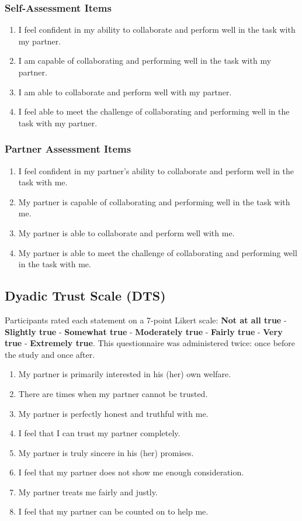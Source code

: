 \subsubsection{Self-Assessment Items}
\begin{enumerate}
    \item I feel confident in my ability to collaborate and perform well in the task with my partner.
    \item I am capable of collaborating and performing well in the task with my partner.
    \item I am able to collaborate and perform well with my partner.
    \item I feel able to meet the challenge of collaborating and performing well in the task with my partner.
\end{enumerate}

\subsubsection{Partner Assessment Items}
\begin{enumerate}
    \item I feel confident in my partner's ability to collaborate and perform well in the task with me.
    \item My partner is capable of collaborating and performing well in the task with me.
    \item My partner is able to collaborate and perform well with me.
    \item My partner is able to meet the challenge of collaborating and performing well in the task with me.
\end{enumerate}

\subsection{Dyadic Trust Scale (DTS)}
\label{appendix:dts}

Participants rated each statement on a 7-point Likert scale: \textbf{Not at all true} - \textbf{Slightly true} - \textbf{Somewhat true} - \textbf{Moderately true} - \textbf{Fairly true} - \textbf{Very true} - \textbf{Extremely true}. This questionnaire was administered twice: once before the study and once after.

\begin{enumerate}
    \item My partner is primarily interested in his (her) own welfare.
    \item There are times when my partner cannot be trusted.
    \item My partner is perfectly honest and truthful with me.
    \item I feel that I can trust my partner completely.
    \item My partner is truly sincere in his (her) promises.
    \item I feel that my partner does not show me enough consideration.
    \item My partner treats me fairly and justly.
    \item I feel that my partner can be counted on to help me.
\end{enumerate}

